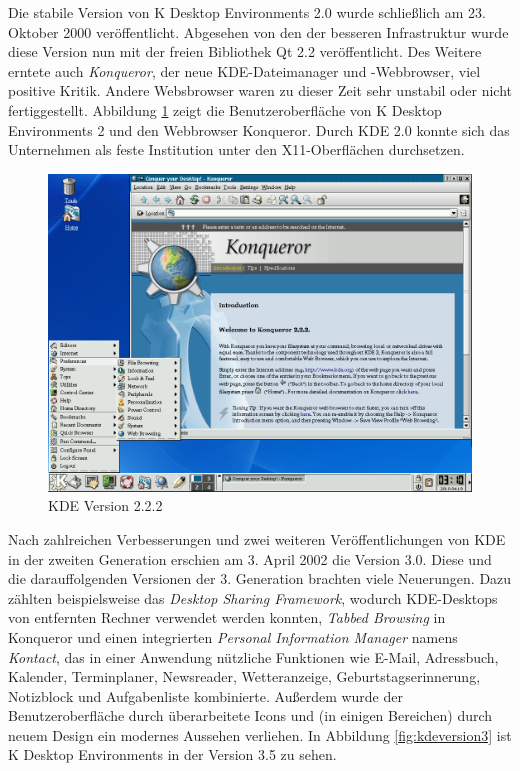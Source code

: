 Die stabile Version von K Desktop Environments 2.0 wurde schließlich am 23. Oktober 2000 veröffentlicht. Abgesehen von den der besseren Infrastruktur wurde diese Version nun mit der freien Bibliothek Qt 2.2 veröffentlicht. Des Weitere erntete auch \textit{Konqueror}, der neue KDE-Dateimanager und -Webbrowser, viel positive Kritik. Andere Websbrowser waren zu dieser Zeit sehr unstabil oder nicht fertiggestellt. Abbildung \ref{fig:kdeversion2} zeigt die Benutzeroberfläche von K Desktop Environments 2 und den Webbrowser Konqueror. Durch KDE 2.0 konnte sich das Unternehmen als feste Institution unter den X11-Oberflächen durchsetzen.

\begin{figure}[h]
	\centering
	\includegraphics[width=\linewidth]{images/KDE_222.png}
	\caption{KDE Version 2.2.2 \cite{kdeversionenwiki}}
	\label{fig:kdeversion2}
\end{figure}

Nach zahlreichen Verbesserungen und zwei weiteren Veröffentlichungen von KDE in der zweiten Generation erschien am 3. April 2002 die Version 3.0. Diese und die darauffolgenden Versionen der 3. Generation brachten viele Neuerungen. Dazu zählten beispielsweise das \textit{Desktop Sharing Framework}, wodurch KDE-Desktops von entfernten Rechner verwendet werden konnten, \textit{Tabbed Browsing} in Konqueror und einen integrierten \textit{Personal Information Manager} namens \textit{Kontact}, das in einer Anwendung nützliche Funktionen wie E-Mail, Adressbuch, Kalender, Terminplaner, Newsreader, Wetteranzeige, Geburtstagserinnerung, Notizblock und Aufgabenliste kombinierte. Außerdem wurde der Benutzeroberfläche durch überarbeitete Icons und (in einigen Bereichen) durch neuem Design ein modernes Aussehen verliehen. In Abbildung \ref{fig:kdeversion3} ist K Desktop Environments in der Version 3.5 zu sehen.

